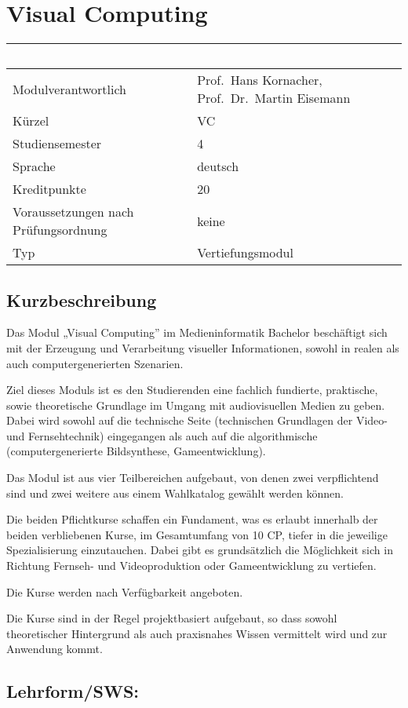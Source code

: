 \chapter{Visual Computing}\label{visual-computing}

\begin{longtable}[]{@{}ll@{}}
\toprule
~ & ~\tabularnewline
\midrule
\endhead
Modulverantwortlich & Prof.~Hans Kornacher, Prof.~Dr.~Martin
Eisemann\tabularnewline
Kürzel & VC\tabularnewline
Studiensemester & 4\tabularnewline
Sprache & deutsch\tabularnewline
Kreditpunkte & 20\tabularnewline
Voraussetzungen nach Prüfungsordnung & keine\tabularnewline
Typ & Vertiefungsmodul\tabularnewline
\bottomrule
\end{longtable}

\section*{Kurzbeschreibung}\label{kurzbeschreibung-4}

Das Modul „Visual Computing'' im Medieninformatik Bachelor beschäftigt
sich mit der Erzeugung und Verarbeitung visueller Informationen, sowohl
in realen als auch computergenerierten Szenarien.

Ziel dieses Moduls ist es den Studierenden eine fachlich fundierte,
praktische, sowie theoretische Grundlage im Umgang mit audiovisuellen
Medien zu geben. Dabei wird sowohl auf die technische Seite (technischen
Grundlagen der Video- und Fernsehtechnik) eingegangen als auch auf die
algorithmische (computergenerierte Bildsynthese, Gameentwicklung).

Das Modul ist aus vier Teilbereichen aufgebaut, von denen zwei
verpflichtend sind und zwei weitere aus einem Wahlkatalog gewählt werden
können.

Die beiden Pflichtkurse schaffen ein Fundament, was es erlaubt innerhalb
der beiden verbliebenen Kurse, im Gesamtumfang von 10 CP, tiefer in die
jeweilige Spezialisierung einzutauchen. Dabei gibt es grundsätzlich die
Möglichkeit sich in Richtung Fernseh- und Videoproduktion oder
Gameentwicklung zu vertiefen.

Die Kurse werden nach Verfügbarkeit angeboten.

Die Kurse sind in der Regel projektbasiert aufgebaut, so dass sowohl
theoretischer Hintergrund als auch praxisnahes Wissen vermittelt wird
und zur Anwendung kommt.

\section*{Lehrform/SWS:}\label{lehrformsws-25}

